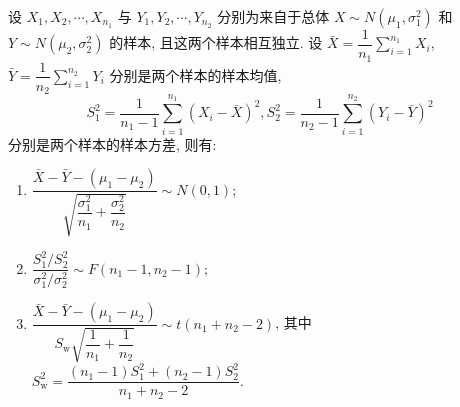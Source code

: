 \begin{theorem}[双正态总体的抽样分布]
    设 $ X_{1}, X_{2}, \cdots, X_{n_{1}} $ 与 $ Y_{1}, Y_{2}, \cdots, Y_{n_{2}} $ 分别为来自于总体 $ X \sim N\left(\mu_{1}, \sigma_{1}^{2}\right) $ 和 $ Y \sim N\left(\mu_{2}, \sigma_{2}^{2}\right) $ 的样本, 且这两个样本相互独立. 设 $\displaystyle \bar{X}=\dfrac{1}{n_{1}} \sum_{i=1}^{n_{1}} X_{i} $, $\displaystyle \bar{Y}=\dfrac{1}{n_{2}} \sum_{i=1}^{n_{2}} Y_{i} $ 分别是两个样本的样本均值, $$\displaystyle S_{1}^{2}=\dfrac{1}{n_{1}-1} \sum_{i=1}^{n_{1}}\left(X_{i}-\bar{X}\right)^{2}, S_{2}^{2}=\dfrac{1}{n_{2}-1} \sum_{i=1}^{n_{2}}\left(Y_{i}-\bar{Y}\right)^{2}$$ 分别是两个样本的样本方差, 则有:
    \begin{enumerate}[label=(\arabic{*})]
        \item $\displaystyle \dfrac{\bar{X}-\bar{Y}-\left(\mu_{1}-\mu_{2}\right)}{\sqrt{\dfrac{\sigma_{1}^{2}}{n_{1}}+\dfrac{\sigma_{2}^{2}}{n_{2}}}} \sim N(0,1) ;$
        \item $\displaystyle \dfrac{S_{1}^{2} / S_{2}^{2}}{\sigma_{1}^{2} / \sigma_{2}^{2}} \sim F\left(n_{1}-1, n_{2}-1\right) ;$
        \item $\displaystyle \dfrac{\bar{X}-\bar{Y}-\left(\mu_{1}-\mu_{2}\right)}{S_{\mathrm{w}} \sqrt{\dfrac{1}{n_{1}}+\dfrac{1}{n_{2}}}} \sim t\left(n_{1}+n_{2}-2\right) $, 其中 $\displaystyle S_{\mathrm{w}}^{2}=\dfrac{\left(n_{1}-1\right) S_{1}^{2}+\left(n_{2}-1\right) S_{2}^{2}}{n_{1}+n_{2}-2} .$
    \end{enumerate}
\end{theorem}